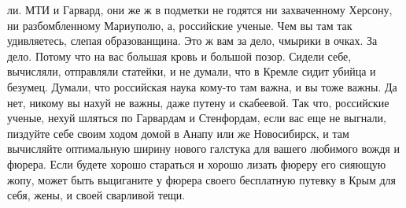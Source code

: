 ли. МТИ и Гарвард, они же ж в подметки не годятся ни захваченному Херсону, ни
разбомбленному Мариуполю, а, российские ученые. Чем вы там так удивляетесь,
слепая образованщина. Это ж вам за дело, чмырики  в очках. За дело. Потому что
на вас большая кровь и большой позор.  Сидели себе, вычисляли, отправляли
статейки, и не думали, что в Кремле сидит убийца и безумец. Думали, что
российская наука кому-то там важна, и вы тоже важны. Да нет, никому вы нахуй не
важны, даже путену и скабеевой. Так что, российские ученые, нехуй шляться по
Гарвардам и Стенфордам, если вас еще не выгнали, пиздуйте себе своим ходом
домой в Анапу или же Новосибирск, и там вычисляйте оптимальную ширину нового
галстука для вашего любимого вождя и фюрера. Если будете хорошо стараться и
хорошо лизать фюреру его сияющую жопу, может быть выциганите у фюрера своего
бесплатную путевку в Крым для себя, жены, и своей сварливой тещи.
